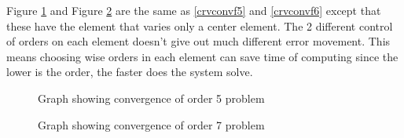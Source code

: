 Figure \ref{crvconvf7} and Figure \ref{crvconvf8} are the same as
\ref{crvconvf5} and \ref{crvconvf6} except that these have the
element that varies only a center element. The 2 different control
of orders on each element doesn't give out much different error
movement. This means choosing wise orders in each element can save
time of computing since the lower is the order, the faster does
the system solve.

\begin{figure}[h]
\begin{center}
\caption{\label{crvconvf7}Graph showing convergence of order 5
problem}
\end{center}
\end{figure}

\begin{figure}[h]
\begin{center}
\caption{\label{crvconvf8}Graph showing convergence of order 7
problem}
\end{center}
\end{figure}
